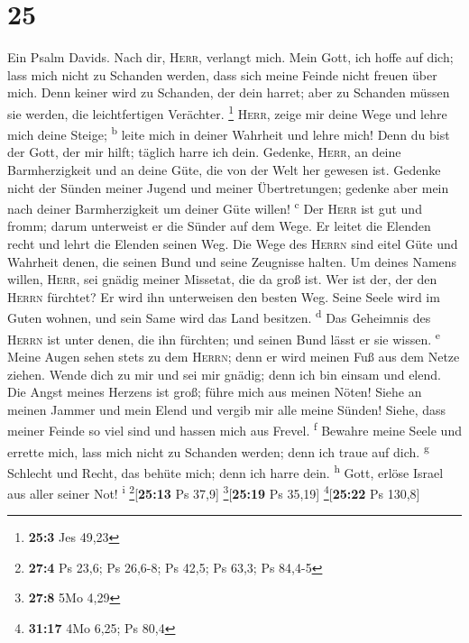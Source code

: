 \hypertarget{section-24}{%
\section{25}\label{section-24}}

 Ein Psalm Davids. Nach dir, \textsc{Herr}, verlangt mich.
 Mein Gott, ich hoffe auf dich; lass mich nicht zu
Schanden werden, dass sich meine Feinde nicht freuen über mich.
 Denn keiner wird zu Schanden, der dein harret; aber zu
Schanden müssen sie werden, die leichtfertigen Verächter. \footnote{\textbf{25:3}
  Jes 49,23}  \textsc{Herr}, zeige mir deine Wege und
lehre mich deine Steige; \textsuperscript{b}  leite mich
in deiner Wahrheit und lehre mich! Denn du bist der Gott, der mir hilft;
täglich harre ich dein.  Gedenke, \textsc{Herr}, an deine
Barmherzigkeit und an deine Güte, die von der Welt her gewesen ist.
 Gedenke nicht der Sünden meiner Jugend und meiner
Übertretungen; gedenke aber mein nach deiner Barmherzigkeit um deiner
Güte willen! \textsuperscript{c}  Der \textsc{Herr} ist
gut und fromm; darum unterweist er die Sünder auf dem Wege.
 Er leitet die Elenden recht und lehrt die Elenden seinen
Weg.  Die Wege des \textsc{Herrn} sind eitel Güte und
Wahrheit denen, die seinen Bund und seine Zeugnisse halten.
 Um deines Namens willen, \textsc{Herr}, sei gnädig
meiner Missetat, die da groß ist.  Wer ist der, der den
\textsc{Herrn} fürchtet? Er wird ihn unterweisen den besten Weg.
 Seine Seele wird im Guten wohnen, und sein Same wird das
Land besitzen. \textsuperscript{d}  Das Geheimnis des
\textsc{Herrn} ist unter denen, die ihn fürchten; und seinen Bund lässt
er sie wissen. \textsuperscript{e}  Meine Augen sehen
stets zu dem \textsc{Herrn}; denn er wird meinen Fuß aus dem Netze
ziehen.  Wende dich zu mir und sei mir gnädig; denn ich
bin einsam und elend.  Die Angst meines Herzens ist groß;
führe mich aus meinen Nöten!  Siehe an meinen Jammer und
mein Elend und vergib mir alle meine Sünden!  Siehe, dass
meiner Feinde so viel sind und hassen mich aus Frevel.
\textsuperscript{f}  Bewahre meine Seele und errette
mich, lass mich nicht zu Schanden werden; denn ich traue auf dich.
\textsuperscript{g}  Schlecht und Recht, das behüte mich;
denn ich harre dein. \textsuperscript{h}  Gott, erlöse
Israel aus aller seiner Not! \textsuperscript{i}
\footnote{\textbf{27:4} Ps 23,6; Ps 26,6-8; Ps 42,5; Ps 63,3; Ps 84,4-5}{[}\textbf{25:13}
Ps 37,9{]} \footnote{\textbf{27:8} 5Mo 4,29}{[}\textbf{25:19} Ps
35,19{]} \footnote{\textbf{31:17} 4Mo 6,25; Ps 80,4}{[}\textbf{25:22} Ps
130,8{]}

